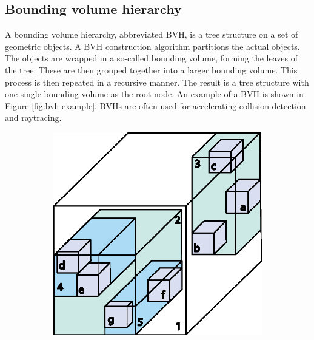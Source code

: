 \subsection{Bounding volume hierarchy}
\label{sec:theory-bounding-volume-hierarchy}
A bounding volume hierarchy, abbreviated BVH, is a tree structure on a set of geometric objects. A BVH construction algorithm partitions the actual objects. The objects are wrapped in a so-called bounding volume, forming the leaves of the tree. These are then grouped together into a larger bounding volume. This process is then repeated in a recursive manner. The result is a tree structure with one single bounding volume as the root node. An example of a BVH is shown in Figure \ref{fig:bvh-example}. BVHs are often used for accelerating collision detection and raytracing.

\begin{figure}[ht]
    \centering
    \begin{subfigure}[c]{0.37\textwidth}
        \vspace{0pt}
        \centering
        \includegraphics[width=\textwidth]{sections/theory/figures/bvh-cube.eps}
    \end{subfigure}
    \hspace{1cm}
    \begin{subfigure}[c]{0.45\textwidth}
        \vspace{0pt}

\end{subfigure}
\end{figure}
